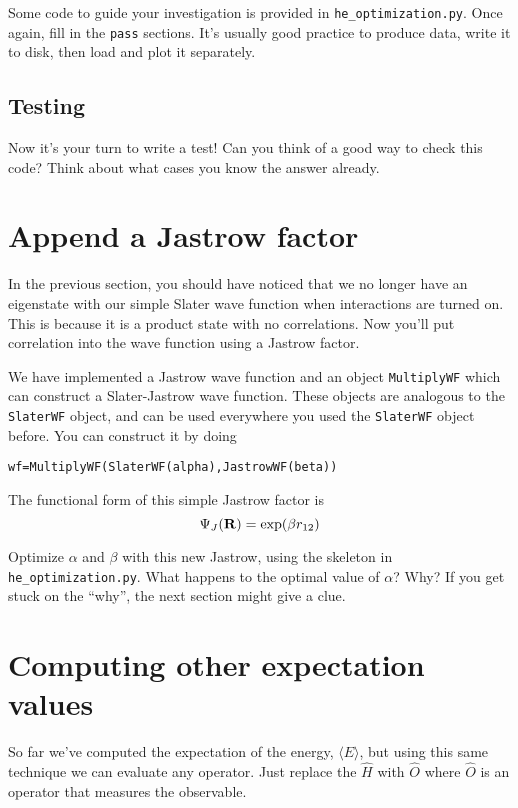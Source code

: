 \documentclass[12pt]{article}
\newcommand{\bR}{{\bf R}}
\begin{document}
Some code to guide your investigation is provided in \verb|he_optimization.py|. 
Once again, fill in the \verb|pass| sections.
It's usually good practice to produce data, write it to disk, then load and plot it separately. 

\subsection{Testing}

Now it's your turn to write a test! 
Can you think of a good way to check this code?
Think about what cases you know the answer already.

\section{Append a Jastrow factor} 

In the previous section, you should have noticed that we no longer have an eigenstate with our simple Slater wave function when interactions are turned on.
This is because it is a product state with no correlations. 
Now you'll put correlation into the wave function using a Jastrow factor.

We have implemented a Jastrow wave function and an object \verb|MultiplyWF| which can construct a Slater-Jastrow wave function.
These objects are analogous to the \verb|SlaterWF| object, and can be used everywhere you used the \verb|SlaterWF| object before.
You can construct it by doing
\begin{verbatim}
wf=MultiplyWF(SlaterWF(alpha),JastrowWF(beta))	
\end{verbatim}
The functional form of this simple Jastrow factor is 
\begin{equation}
\Psi_J(\bR) = \exp(\beta r_{12})	
\end{equation}

Optimize $\alpha$ and $\beta$ with this new Jastrow, using the skeleton in \verb|he_optimization.py|.
What happens to the optimal value of $\alpha$? Why? 
If you get stuck on the ``why'', the next section might give a clue.

\section{Computing other expectation values}

So far we've computed the expectation of the energy, $\langle E \rangle$, but using this same technique we can evaluate any operator.
Just replace the $\hat{H}$ with $\hat{O}$ where $\hat{O}$ is an operator that measures the observable.
\end{document}
